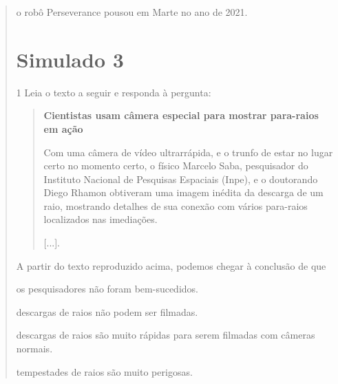 \begin{quote}
\begin{escolha}
\item o robô Perseverance pousou em Marte no ano de 2021.
\end{escolha}


\chapter{Simulado 3}

\num{1} Leia o texto a seguir e responda à pergunta:

\begin{quote}
\textbf{Cientistas usam câmera especial para mostrar para-raios em ação}

Com uma câmera de vídeo ultrarrápida, e o trunfo de estar no lugar
certo no momento certo, o físico Marcelo Saba, pesquisador do Instituto
Nacional de Pesquisas Espaciais (Inpe), e o doutorando Diego Rhamon
obtiveram uma imagem inédita da descarga de um raio, mostrando detalhes
de sua conexão com vários para-raios localizados nas imediações.

{[}...{]}.

\end{quote}

A partir do texto reproduzido acima, podemos chegar à conclusão de que

\begin{escolha}
\item os pesquisadores não foram bem-sucedidos.

\item descargas de raios não podem ser filmadas.

\item descargas de raios são muito rápidas para serem filmadas com câmeras normais.

\item tempestades de raios são muito perigosas.
\end{escolha}


\end{quote}
